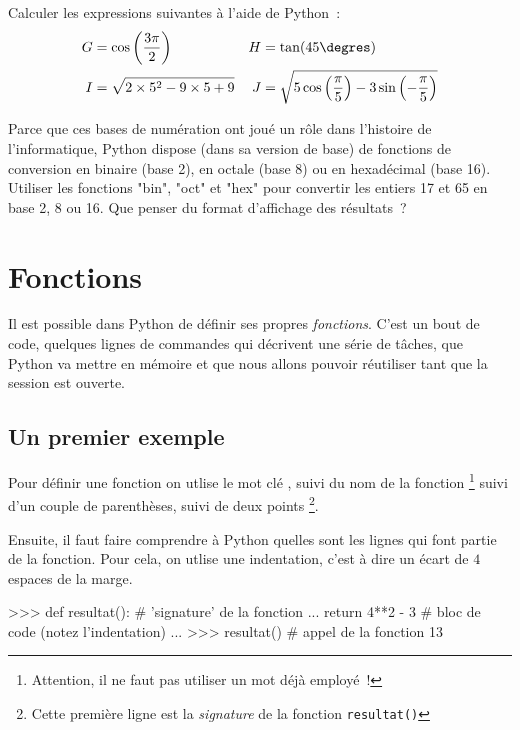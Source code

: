 \begin{exercice}
Calculer les expressions suivantes à l'aide de Python~:
\begin{align*}
G &= \cos\left(\frac{3\pi}{2}\right)
&
H &= \tan(45\degres)\\
I &= \sqrt{2\times5^2-9\times5+9}
&
J &= \sqrt{5\cos\left(\frac{\pi}{5}\right)-3\sin\left(-\frac{\pi}{5}\right)}
\end{align*}
\end{exercice}

\begin{exercice}
Parce que ces bases de numération ont joué un rôle dans l'histoire de l'informatique, Python dispose
 (dans sa version de base) de fonctions de conversion en binaire (base 2), en octale (base 8) ou en
 hexadécimal (base 16). Utiliser les fonctions "bin", "oct" et "hex" pour convertir les entiers 17
 et 65 en base 2, 8 ou 16. Que penser du format d'affichage des résultats~?
\end{exercice}



\section{Fonctions}\label{python:fonctions}
Il est possible dans Python de définir ses propres \textit{fonctions}. C'est un bout de code,
quelques lignes de commandes qui décrivent une série de tâches, que Python va mettre en mémoire
et que nous allons pouvoir réutiliser tant que la session est ouverte.

\subsection{Un premier exemple}
Pour définir une fonction on utlise le mot clé , suivi du nom de la fonction
\footnote{Attention, il ne faut pas utiliser un mot déjà employé~!}
suivi d'un couple de parenthèses, suivi de deux points \motcle{:}
\footnote{Cette première ligne est la \textit{signature}
de la fonction \texttt{resultat()}}.

Ensuite, il faut faire comprendre à Python quelles sont les lignes qui font partie de la fonction.
Pour cela, on utlise une {indentation}, c'est à dire un écart de $4$ espaces de la marge.

\begin{pythoncode}
>>> def resultat():            # 'signature' de la fonction
...    return 4**2 - 3          # bloc de code (notez l'indentation)
...
>>> resultat()                  # appel de la fonction
13
\end{pythoncode}

